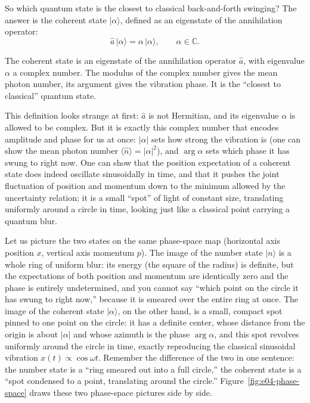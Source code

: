So which quantum state is the closest to classical back-and-forth swinging? The answer is the coherent state \(|\alpha\rangle\), defined as an eigenstate of the annihilation operator:
\begin{equation}
  \hat a\,|\alpha\rangle=\alpha\,|\alpha\rangle,\qquad \alpha\in\mathbb{C}.
  \label{eq:e04-coherent}
\end{equation}
\begin{formulaexplain}
The coherent state is an eigenstate of the annihilation operator \(\hat a\), with eigenvalue \(\alpha\) a complex number. The modulus of the complex number gives the mean photon number, its argument gives the vibration phase. It is the ``closest to classical'' quantum state.
\end{formulaexplain}
This definition looks strange at first: \(\hat a\) is not Hermitian, and its eigenvalue \(\alpha\) is allowed to be complex. But it is exactly this complex number that encodes amplitude and phase for us at once: \(|\alpha|\) sets how strong the vibration is (one can show the mean photon number \(\langle\hat n\rangle=|\alpha|^2\)), and \(\arg\alpha\) sets which phase it has swung to right now. One can show that the position expectation of a coherent state does indeed oscillate sinusoidally in time, and that it pushes the joint fluctuation of position and momentum down to the minimum allowed by the uncertainty relation; it is a small ``spot'' of light of constant size, translating uniformly around a circle in time, looking just like a classical point carrying a quantum blur.

Let us picture the two states on the same phase-space map (horizontal axis position \(x\), vertical axis momentum \(p\)). The image of the number state \(|n\rangle\) is a whole ring of uniform blur: its energy (the square of the radius) is definite, but the expectations of both position and momentum are identically zero and the phase is entirely undetermined, and you cannot say ``which point on the circle it has swung to right now,'' because it is smeared over the entire ring at once. The image of the coherent state \(|\alpha\rangle\), on the other hand, is a small, compact spot pinned to one point on the circle: it has a definite center, whose distance from the origin is about \(|\alpha|\) and whose azimuth is the phase \(\arg\alpha\), and this spot revolves uniformly around the circle in time, exactly reproducing the classical sinusoidal vibration \(x(t)\propto\cos\omega t\). Remember the difference of the two in one sentence: the number state is a ``ring smeared out into a full circle,'' the coherent state is a ``spot condensed to a point, translating around the circle.'' Figure~\ref{fig:e04-phase-space} draws these two phase-space pictures side by side.

